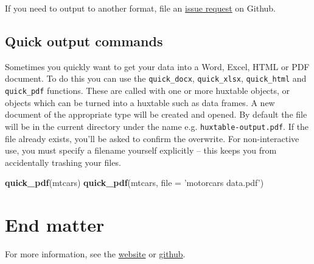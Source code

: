 \documentclass[]{article}
\newenvironment{Shaded}{\begin{snugshade}}{\end{snugshade}}
\newcommand{\KeywordTok}[1]{\textcolor[rgb]{0.13,0.29,0.53}{\textbf{#1}}}
\newcommand{\DataTypeTok}[1]{\textcolor[rgb]{0.13,0.29,0.53}{#1}}
\newcommand{\StringTok}[1]{\textcolor[rgb]{0.31,0.60,0.02}{#1}}
\newcommand{\NormalTok}[1]{#1}
\begin{document}
If you need to output to another format, file an
\href{https://github.com/hughjonesd/huxtable}{issue request} on Github.

\subsection{Quick output commands}\label{quick-output-commands}

Sometimes you quickly want to get your data into a Word, Excel, HTML or
PDF document. To do this you can use the \texttt{quick\_docx},
\texttt{quick\_xlsx}, \texttt{quick\_html} and \texttt{quick\_pdf}
functions. These are called with one or more huxtable objects, or
objects which can be turned into a huxtable such as data frames. A new
document of the appropriate type will be created and opened. By default
the file will be in the current directory under the name e.g.
\texttt{huxtable-output.pdf}. If the file already exists, you'll be
asked to confirm the overwrite. For non-interactive use, you must
specify a filename yourself explicitly -- this keeps you from
accidentally trashing your files.

\begin{Shaded}
\begin{Highlighting}[]
\KeywordTok{quick_pdf}\NormalTok{(mtcars) }
\KeywordTok{quick_pdf}\NormalTok{(mtcars, }\DataTypeTok{file =} \StringTok{'motorcars data.pdf'}\NormalTok{)}
\end{Highlighting}
\end{Shaded}

\FloatBarrier

\section{End matter}\label{end-matter}

For more information, see the
\href{https://hughjonesd.github.io/huxtable}{website} or
\href{https://github.com/hughjonesd/huxtable}{github}.
\end{document}
